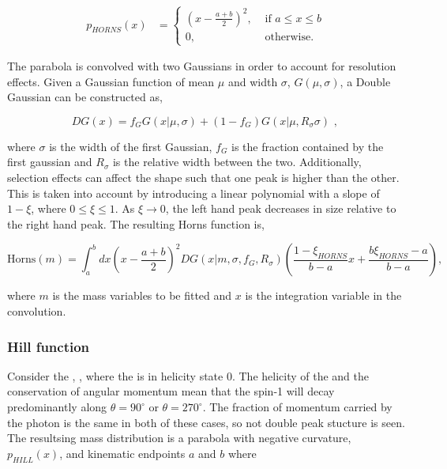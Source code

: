 \begin{align}
p_{HORNS}(x) &= \begin{cases}
\left(x - \frac{a+b}{2}\right)^2, & \text{ if $a \leq x \leq b$}\\ 	
0, & \text{ otherwise.}
\end{cases} 
\end{align}

The parabola is convolved with two Gaussians in order to account for resolution effects. Given a Gaussian function of mean $\mu$ and width $\sigma$, $G(\mu,\sigma)$, a Double Gaussian can be constructed as,

\begin{equation}
DG(x) = f_G G(x|\mu,\sigma) + \left(1-f_G\right) G(x|\mu,R_{\sigma}\sigma) \text{ , }
\end{equation}

where $\sigma$ is the width of the first Gaussian, $f_G$ is the fraction contained by the first gaussian and $R_{\sigma}$ is the relative width between the two. Additionally, selection effects can affect the shape such that one peak is higher than the other. This is taken into account by introducing a linear polynomial with a slope of $1 - \xi$, where $0 \leq \xi \leq 1$. As $\xi \rightarrow 0$, the left hand peak decreases in size relative to the right hand peak. The resulting Horns function is,

\begin{equation}
\text{Horns}(m) = \int_a^b dx \left(x - \frac{a+b}{2}\right)^2 DG(x|m,\sigma,f_G,R_{\sigma}) \left( \frac{1 - \xi_{HORNS}}{b - a}x + \frac{b\xi_{HORNS} - a}{b - a}\right),
\label{eqn:horns}
\end{equation}

where $m$ is the mass variables to be fitted and $x$ is the integration variable in the convolution.

\subsubsection{Hill function}

Consider the \decay{\Bm}{\Dstarz\Kstarm}, \decay{\Dstarz}{\Dz\gamma}, where the \Dstarz is in helicity state 0. The helicity of the \Dstarz and the conservation of angular momentum mean that the spin-1 \Pgamma will decay predominantly along $\theta = 90^{\circ}$ or $\theta = 270^{\circ}$. The fraction of momentum carried by the photon is the same in both of these cases, so not double peak stucture is seen. The resultsing \B mass distribution is a parabola with negative curvature, $p_{HILL}(x)$, and kinematic endpoints $a$ and $b$ where

